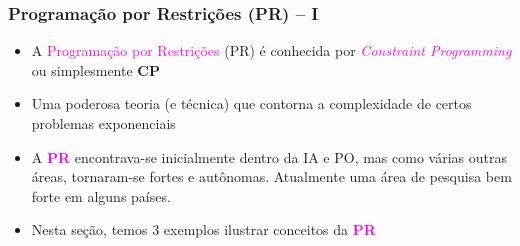 \begin{frame}[fragile]

    \frametitle{Programação por Restrições (PR) -- I}

   \begin{block}{}
     \begin{itemize}
     
      \item A \textcolor{magenta}{Programação por Restrições} (PR) é conhecida por \textcolor{magenta}{\textit{Constraint Programming}} 
      ou simplesmente \textbf{CP}

      \pause
      \item Uma poderosa teoria (e técnica)  que  contorna a complexidade de certos problemas
      exponenciais
             
      \pause
      \item A \textbf{\textcolor{magenta}{PR}} encontrava-se inicialmente dentro da IA e PO, mas como várias outras áreas, tornaram-se
      fortes e autônomas. Atualmente uma área de pesquisa bem forte em alguns países.
      
      \pause
      \item Nesta seção, temos 3 exemplos ilustrar conceitos da \textbf{\textcolor{magenta}{PR}}
    \end{itemize}
    
    \end{block}
    
\end{frame}




